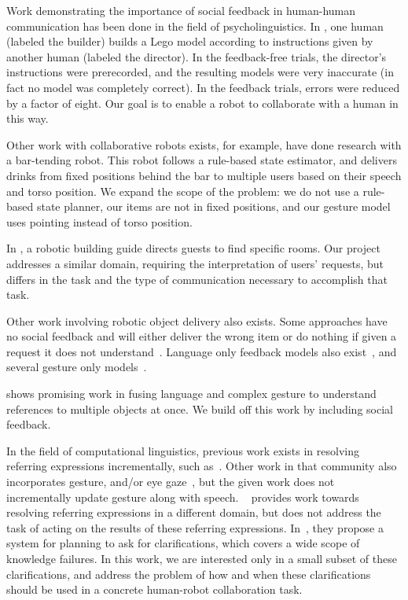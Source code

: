 \documentclass{article}
\begin{document}
Work demonstrating the importance of social feedback in human-human
communication has been done in the field of psycholinguistics. In  \cite{clark04}, one human (labeled the builder)
builds a Lego model according to instructions given by another human
(labeled the director). In the feedback-free trials, the director's
instructions were prerecorded, and the resulting models were very
inaccurate (in fact no model was completely correct). In the feedback
trials, errors were reduced by a factor of eight. Our goal is to
enable a robot to collaborate with a human in this way.


Other work with collaborative robots exists, for example, \cite{foster12} have done research with a bar-tending robot. This robot follows a rule-based state estimator, and delivers drinks from fixed positions behind the bar to multiple users based on their speech and torso position. 
We expand the scope of the problem: we do not use a rule-based state planner, our items are not in fixed positions, and our gesture model uses pointing instead of torso position. 

In \cite{bohus14},  a robotic building guide directs guests to find specific rooms. Our project addresses a similar domain, requiring the interpretation of users' requests, but differs in the task and the type of communication necessary to accomplish that task. 

Other work involving robotic object delivery also exists. Some approaches have no social feedback and will either deliver the wrong item or do nothing if given a
request it does not understand~\citep{tellex11,matuszek12,tellex12,misra14}. Language only feedback models also 
exist~\citep{chai14,macmahon06,tellex11,matuszek12,guadarrama14,hewlett11,misra14}, and several gesture only models~\citep{waldherr00,marge11}.


\cite{matuszek14} shows promising work in fusing language and complex gesture to understand references to multiple objects at once. We build off this work by including social feedback. 

In the field of computational linguistics, previous work exists in resolving referring expressions incrementally, such as~\cite{schlangen09,Zender2008Conceptual,Gieselmann}. Other work in that community also incorporates gesture, and/or eye gaze~\citep{kennington13,kennington15a}, but the given work does not incrementally update gesture along with speech. ~\cite{chairmi} provides work towards resolving referring expressions in a different domain, but does not address the task of acting on the results of these referring expressions. In~\cite{kruijffclarification}, they propose a system for planning to ask for clarifications, which covers a wide scope of knowledge failures. In this work, we are interested only in a small subset of these clarifications, and address the problem of how and when these clarifications should be used in a concrete human-robot collaboration task. 
\end{document}
